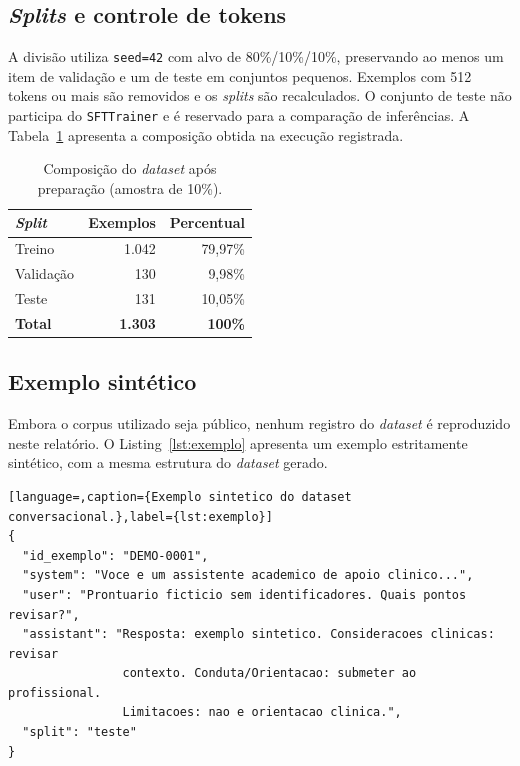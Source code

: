 \documentclass[12pt,a4paper]{article}
\begin{document}
\subsection{\emph{Splits} e controle de tokens}

A divisão utiliza \texttt{seed=42} com alvo de 80\%/10\%/10\%, preservando ao
menos um item de validação e um de teste em conjuntos pequenos. Exemplos com 512
tokens ou mais são removidos e os \emph{splits} são recalculados. O conjunto de
teste não participa do \texttt{SFTTrainer} e é reservado para a comparação de
inferências. A Tabela~\ref{tab:splits} apresenta a composição obtida na execução
registrada.

\begin{table}[htbp]
\centering
\caption{Composição do \emph{dataset} após preparação (amostra de 10\%).}
\label{tab:splits}
\footnotesize
\begin{tabular}{lrr}
\toprule
\textbf{\emph{Split}} & \textbf{Exemplos} & \textbf{Percentual} \\
\midrule
Treino    & 1.042 & 79,97\% \\
Validação &   130 & 9,98\%  \\
Teste     &   131 & 10,05\% \\
\midrule
\textbf{Total} & \textbf{1.303} & \textbf{100\%} \\
\bottomrule
\end{tabular}
\end{table}

\subsection{Exemplo sintético}

Embora o corpus utilizado seja público, nenhum registro do \emph{dataset} é
reproduzido neste relatório. O Listing~\ref{lst:exemplo} apresenta um exemplo
estritamente sintético, com a mesma estrutura do \emph{dataset} gerado.

\begin{lstlisting}[language=,caption={Exemplo sintetico do dataset conversacional.},label={lst:exemplo}]
{
  "id_exemplo": "DEMO-0001",
  "system": "Voce e um assistente academico de apoio clinico...",
  "user": "Prontuario ficticio sem identificadores. Quais pontos revisar?",
  "assistant": "Resposta: exemplo sintetico. Consideracoes clinicas: revisar
                contexto. Conduta/Orientacao: submeter ao profissional.
                Limitacoes: nao e orientacao clinica.",
  "split": "teste"
}
\end{lstlisting}
\end{document}
